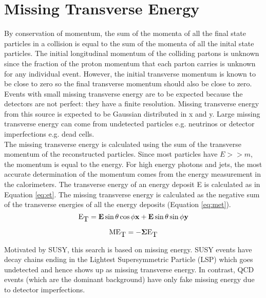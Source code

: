 \section{Missing Transverse Energy}

By conservation of momentum, the sum of the momenta of all the final state
particles in a collision is equal to the sum of the momenta of all the inital
state particles. The initial longitudinal momentum of the colliding partons is
unknown since the fraction of the proton momentum that each parton carries is
unknown for any individual event. However, the initial transverse momentum is
known to be close to zero so the final transverse momentum should also be close
to zero. \\

Events with small missing transverse energy are to be expected because the 
detectors are not perfect: they have a finite resolution. Missing transverse
energy from this source is expected to be Gaussian distributed in x and y. Large 
missing transverse energy can come from undetected particles e.g. neutrinos or
detector imperfections e.g. dead cells. \\

The missing transverse energy is calculated using the sum of the transverse
momentum of the reconstructed particles. Since most particles have $E >> m$, the
momentum is equal to the energy. For high energy photons and jets, the most 
accurate determination of the momentum comes from the energy measurement in the
calorimeters. The transverse energy of an energy deposit E is calculated as in 
Equation \ref{eq:et}. The missing transverse energy is calculated as the
negative sum of the transverse energies of all the energy deposits (Equation
\ref{eq:met}). \\

\begin{equation}
\bf{\mbox{E}_{\mbox{T}}} = E\sin{\theta}\cos{\phi}\bf{x} + E\sin{\theta}\sin{\phi}\bf{y}
\label{eq:et}
\end{equation}

\begin{equation}
\bf{\mbox{ME}_{\mbox{T}}} = - \Sigma \bf{\mbox{E}_{\mbox{T}}}
\label{eq:met}
\end{equation}

Motivated by SUSY, this search is based on missing energy. SUSY events have 
decay chains ending in the Lightest Supersymmetric Particle (LSP) which goes
undetected and hence shows up as missing transverse energy. In contrast, QCD 
events (which are the dominant background) have only fake missing energy due to
detector imperfections. \\

